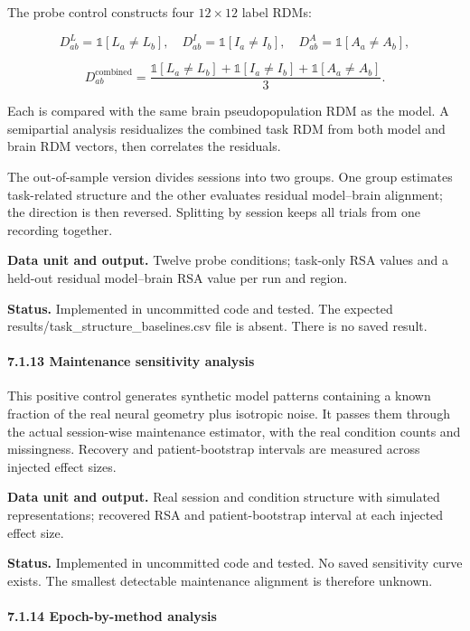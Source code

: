 \documentclass[
  10pt,
]{article}
\begin{document}
The probe control constructs four \(12\times12\) label RDMs:

\[
D_{ab}^{L}=\mathbb 1[L_a\ne L_b],\quad
D_{ab}^{I}=\mathbb 1[I_a\ne I_b],\quad
D_{ab}^{A}=\mathbb 1[A_a\ne A_b],
\]

\[
D_{ab}^{\mathrm{combined}}
=
\frac{
\mathbb 1[L_a\ne L_b]
+
\mathbb 1[I_a\ne I_b]
+
\mathbb 1[A_a\ne A_b]
}{3}.
\]

Each is compared with the same brain pseudopopulation RDM as the model.
A semipartial analysis residualizes the combined task RDM from both
model and brain RDM vectors, then correlates the residuals.

The out-of-sample version divides sessions into two groups. One group
estimates task-related structure and the other evaluates residual
model--brain alignment; the direction is then reversed. Splitting by
session keeps all trials from one recording together.

\textbf{Data unit and output.} Twelve probe conditions; task-only RSA
values and a held-out residual model--brain RSA value per run and
region.

\textbf{Status.} Implemented in uncommitted code and tested. The
expected results/task\_structure\_baselines.csv file is absent. There is
no saved result.

\hypertarget{maintenance-sensitivity-analysis}{%
\paragraph{7.1.13 Maintenance sensitivity
analysis}\label{maintenance-sensitivity-analysis}}

This positive control generates synthetic model patterns containing a
known fraction of the real neural geometry plus isotropic noise. It
passes them through the actual session-wise maintenance estimator, with
the real condition counts and missingness. Recovery and
patient-bootstrap intervals are measured across injected effect sizes.

\textbf{Data unit and output.} Real session and condition structure with
simulated representations; recovered RSA and patient-bootstrap interval
at each injected effect size.

\textbf{Status.} Implemented in uncommitted code and tested. No saved
sensitivity curve exists. The smallest detectable maintenance alignment
is therefore unknown.

\hypertarget{epoch-by-method-analysis}{%
\paragraph{7.1.14 Epoch-by-method
analysis}\label{epoch-by-method-analysis}}
\end{document}
